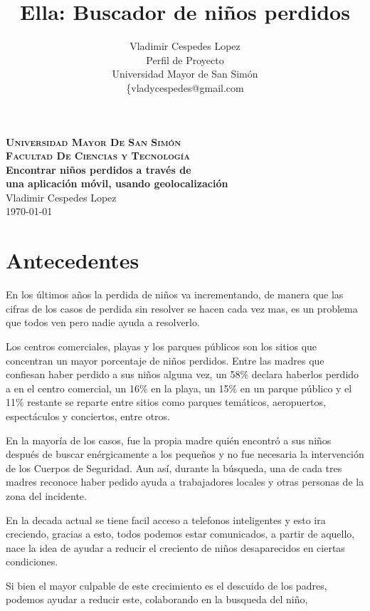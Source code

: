 \documentclass[letter,11pt,oneside,spanish]{article}
\title{\textbf{Ella: Buscador de niños perdidos}}
\author{Vladimir Cespedes Lopez\\
Perfil de Proyecto\\
Universidad Mayor de San Simón\\
\{vladycespedes@gmail.com\\}
\date{}
\begin{document}
\begin{titlepage}
\thispagestyle{empty}
\begin{center}
\large{\textsc{\bf Universidad Mayor De San Simón}}\\
\large{\textsc{\bf Facultad De Ciencias y Tecnología}}\\
\vspace{4.0cm}
\large{\bf Encontrar niños perdidos a través de \\
una aplicación móvil, usando geolocalización}\\
\vspace{1.0cm}
\small{Vladimir Cespedes Lopez}
~\\
\small{\today}
\end{center}
\end{titlepage}

\newpage
\tableofcontents

\newpage
\section{Antecedentes}
En los últimos años la perdida de niños va incrementando, de manera que las cifras de los 
casos de perdida sin resolver se hacen cada vez mas, es un problema que todos ven pero 
nadie ayuda a resolverlo.

Los centros comerciales, playas y los parques públicos son los sitios que 
concentran un mayor porcentaje de niños perdidos. Entre las madres que confiesan 
haber perdido a sus niños alguna vez, un 58\% declara haberlos perdido a en el 
centro comercial, un 16\% en la playa, un 15\% en un parque público y el 11\% 
restante se reparte entre sitios como parques temáticos, aeropuertos, 
espectáculos y conciertos, entre otros.

En la mayoría de los casos, fue la propia madre quién encontró a sus niños 
después de buscar enérgicamente a los pequeños y no fue necesaria la 
intervención de los Cuerpos de Seguridad. Aun así, durante la búsqueda, 
una de cada tres madres reconoce haber pedido ayuda a trabajadores locales 
y otras personas de la zona del incidente.

En la decada actual se tiene facil acceso a telefonos inteligentes y esto ira creciendo,
 gracias a esto, todos podemos estar comunicados, a partir de aquello, nace la idea de 
 ayudar a reducir el creciento de niños desaparecidos en ciertas condiciones.
 
Si bien el mayor culpable de este crecimiento es el descuido de los padres, podemos 
ayudar a reducir este, colaborando en la busqueda del niño, 
\end{document}
